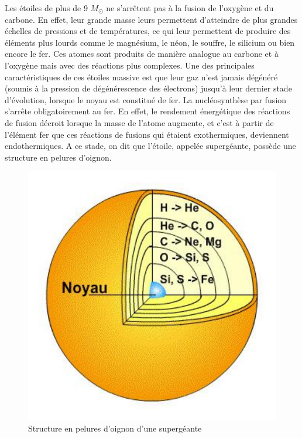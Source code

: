 Les étoiles de plus de 9 $M_\odot$ ne s’arrêtent pas à la fusion de l’oxygène et du carbone. En effet, leur grande masse leurs permettent d’atteindre de plus grandes échelles de pressions et de températures, ce qui leur permettent de produire des éléments plus lourds comme le magnésium, le néon, le souffre, le silicium ou bien encore le fer. Ces atomes sont produits de manière analogue au carbone et à l’oxygène mais avec des réactions plus complexes. Une des principales caractéristiques de ces étoiles massive est que leur gaz n’est jamais dégénéré (soumis à la pression de dégénérescence des électrons) jusqu’à leur dernier stade d’évolution, lorsque le noyau est constitué de fer. La nucléosynthèse par fusion s’arrête obligatoirement au fer. En effet, le rendement énergétique des réactions de fusion décroit lorsque la masse de l’atome augmente, et c’est à partir de l’élément fer que ces réactions de fusions qui étaient exothermiques, deviennent endothermiques. A ce stade, on dit que l’étoile, appelée supergéante, possède une structure en pelures d’oignon.

\begin{figure}[H]
	\centering
	\includegraphics[scale=0.3]{images/oignon}
	\caption{Structure en pelures d'oignon d'une supergéante}
\end{figure}\newpage

